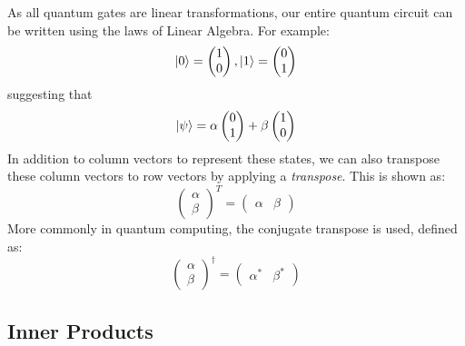 \documentclass{article}
\begin{document}
As all quantum gates are linear transformations, our entire quantum circuit can be written using the laws of Linear Algebra. For example:
\[
    \ket{0}=
    \begin{pmatrix}
    1 \\
    0
    \end{pmatrix}
    ,
    \ket{1}=
    \begin{pmatrix}
    0 \\
    1
    \end{pmatrix}
\]
suggesting that 
\[
    \ket{\psi}=
    \alpha
    \begin{pmatrix}
    0 \\
    1
    \end{pmatrix}
    + \beta
    \begin{pmatrix}
    1 \\
    0
    \end{pmatrix}
\]
In addition to column vectors to represent these states, we can also transpose these column vectors to row vectors by applying a \textit{transpose}. This is shown as:
\[
    \begin{pmatrix}
        \alpha\\
        \beta
    \end{pmatrix}^{T}
    = 
    \begin{pmatrix} 
        \alpha & \beta 
    \end{pmatrix}
\]
More commonly in quantum computing, the conjugate transpose is used, defined as:
\[
    \begin{pmatrix}
        \alpha\\
        \beta
    \end{pmatrix}^{\dagger}
    = 
    \begin{pmatrix} 
        \alpha^* & \beta^*
    \end{pmatrix}
\]

\subsection{Inner Products}
\end{document}
